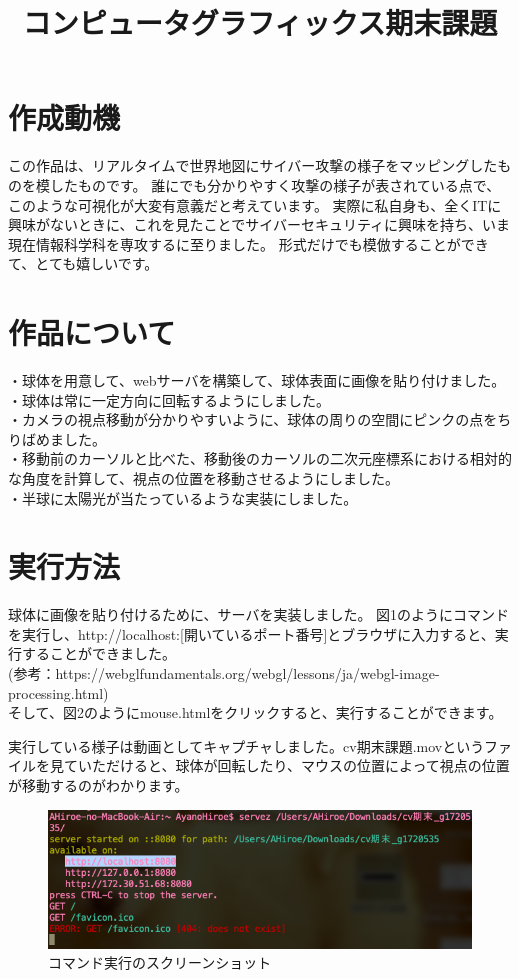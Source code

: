 \documentclass[a4paper,12pt]{jarticle}
\begin{document}
\title{コンピュータグラフィックス期末課題}
\maketitle
\section{作成動機}
この作品は、リアルタイムで世界地図にサイバー攻撃の様子をマッピングしたものを模したものです。
誰にでも分かりやすく攻撃の様子が表されている点で、このような可視化が大変有意義だと考えています。
実際に私自身も、全くITに興味がないときに、これを見たことでサイバーセキュリティに興味を持ち、いま現在情報科学科を専攻するに至りました。
形式だけでも模倣することができて、とても嬉しいです。
\section{作品について}
・球体を用意して、webサーバを構築して、球体表面に画像を貼り付けました。
\\
・球体は常に一定方向に回転するようにしました。\\
・カメラの視点移動が分かりやすいように、球体の周りの空間にピンクの点をちりばめました。\\
・移動前のカーソルと比べた、移動後のカーソルの二次元座標系における相対的な角度を計算して、視点の位置を移動させるようにしました。\\
・半球に太陽光が当たっているような実装にしました。\\


\section{実行方法}
球体に画像を貼り付けるために、サーバを実装しました。
図1のようにコマンドを実行し、http://localhost:[開いているポート番号]とブラウザに入力すると、実行することができました。\\
(参考：https://webglfundamentals.org/webgl/lessons/ja/webgl-image-processing.html)\\
そして、図2のようにmouse.htmlをクリックすると、実行することができます。

実行している様子は動画としてキャプチャしました。cv期末課題.movというファイルを見ていただけると、球体が回転したり、マウスの位置によって視点の位置が移動するのがわかります。
\begin{figure}[h]
\begin{center}
 \includegraphics[width=150mm]{server.png}
 \caption{コマンド実行のスクリーンショット}
\end{center}
\end{figure}
\end{document}
